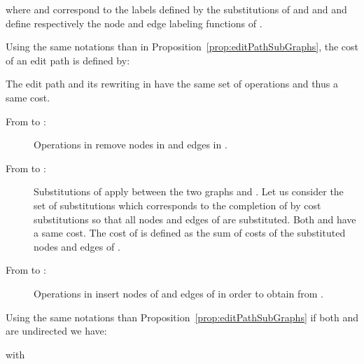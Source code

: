 where  and  correspond to the labels defined by the
substitutions of  and  and  and  define
respectively the node and edge labeling functions of .
\begin{corollary}\label{coro:costEditPath}
  Using the same notations than in
  Proposition~\ref{prop:editPathSubGraphs}, the cost  of an
  edit path is defined by:
  \renewcommand{\arraystretch}{2}
   
\end{corollary}
  The edit path  and its rewriting in  have the same set of
  operations and thus a same cost.
  \begin{description}
  \item[From  to :] Operations in  remove
    nodes in  and edges in .
  \item[From  to :] Substitutions of  apply
    between the two graphs  and . Let us
    consider the set of substitutions  which corresponds to the
    completion of  by  cost substitutions so that all nodes
    and edges of  are substituted. Both  and  have
    a same cost. The cost of  is defined as the sum of costs of
    the substituted nodes and edges of .
  \item[From  to :] Operations in  insert
    nodes of  and edges of  in
    order to obtain  from .~~{}
  \end{description}
\begin{remarque}\label{rem:doubleCounting}
  Using the same notations than
  Proposition~\ref{prop:editPathSubGraphs} if both  and  are
  undirected we have:
  
  with
   
\end{remarque}


